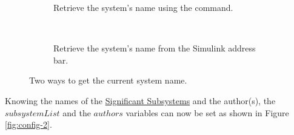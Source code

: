 \documentclass{mcscert}
\newcommand{\simulink}{Simulink}
\newcommand{\sigsubsnolink}{Significant Subsystems} %
\newcommand{\sigsubs}{\hyperref[def:sigsubs]{\sigsubsnolink{}}}
\begin{document}
\begin{figure}
    \centering
    \begin{subfigure}[c]{0.45\textwidth}
        \caption{Retrieve the system's name using the  command.}
        \label{fig:gcs}
    \end{subfigure}
    ~
    \begin{subfigure}[c]{0.45\textwidth}
        \caption{Retrieve the system's name from the \simulink{} address bar.}
        \label{fig:gcs-address-bar}
    \end{subfigure}
    \caption{Two ways to get the current system name.}\label{fig:current-system-name}
\end{figure}

Knowing the names of the \sigsubs{} and the author(s), the $subsystemList$ and the $authors$ variables can now be set as shown in Figure \ref{fig:config-2}.
\end{document}
